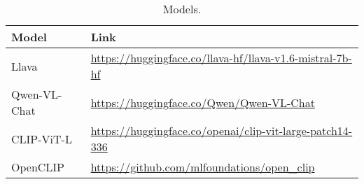 \begin{table*}[h]
    \centering
    \begin{tabular}{l l}
    \toprule
        Model & Link\\
        \midrule
        Llava & \footnotesize \url{https://huggingface.co/llava-hf/llava-v1.6-mistral-7b-hf}\\
        Qwen-VL-Chat &  \footnotesize \url{https://huggingface.co/Qwen/Qwen-VL-Chat}\\
        CLIP-ViT-L &\footnotesize \url{https://huggingface.co/openai/clip-vit-large-patch14-336}\\
        OpenCLIP & \footnotesize \url{https://github.com/mlfoundations/open_clip}\\
         \bottomrule
    \end{tabular}%
    \caption{Models.}
    \vspace{-0.1in}
    \label{tab:model_details}
\end{table*}
